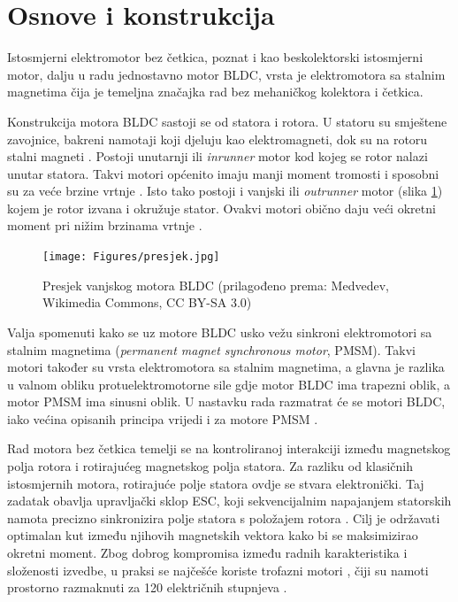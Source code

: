 \documentclass[diplomskirad, upload]{fer}
\begin{document}
\section{Osnove i konstrukcija}
\label{sec:bldc:uvod}

Istosmjerni elektromotor bez četkica, poznat i kao beskolektorski istosmjerni
motor, dalju u radu jednostavno motor BLDC, vrsta je elektromotora sa stalnim
magnetima čija je temeljna značajka rad bez mehaničkog kolektora i četkica.

Konstrukcija motora BLDC sastoji se od statora i rotora. U statoru su smještene
zavojnice, bakreni namotaji koji djeluju kao elektromagneti, dok su na rotoru
stalni magneti \cite{elektromotor-beskolektorski}. Postoji unutarnji ili
\textit{inrunner} motor kod kojeg se rotor nalazi unutar statora. Takvi motori
općenito imaju manji moment tromosti i sposobni su za veće brzine vrtnje
\cite{cite:bldc}. Isto tako postoji i vanjski ili \textit{outrunner} motor
(slika \ref{fig:presjek_motora}) kojem je rotor izvana i okružuje stator.
Ovakvi motori obično daju veći okretni moment pri nižim brzinama vrtnje
\cite{cite:bldc}.

\begin{figure}[h!]
	\centering
	\texttt{[image: Figures/presjek.jpg]}
	\caption{Presjek vanjskog motora BLDC (prilagođeno prema: Medvedev, Wikimedia Commons, CC BY-SA 3.0)}
	\label{fig:presjek_motora}
\end{figure}

Valja spomenuti kako se uz motore BLDC usko vežu sinkroni elektromotori sa
stalnim magnetima (\textit{permanent magnet synchronous motor}, PMSM). Takvi
motori također su vrsta elektromotora sa stalnim magnetima, a glavna je razlika
u valnom obliku protuelektromotorne sile gdje motor BLDC ima trapezni oblik, a
motor PMSM ima sinusni oblik. U nastavku rada razmatrat će se motori BLDC, iako
većina opisanih principa vrijedi i za motore PMSM
\cite{elektromotor-sa-stalnim-magnetima}.

Rad motora bez četkica temelji se na kontroliranoj interakciji između
magnetskog polja rotora i rotirajućeg magnetskog polja statora. Za razliku od
klasičnih istosmjernih motora, rotirajuće polje statora ovdje se stvara
elektronički. Taj zadatak obavlja upravljački sklop ESC, koji sekvencijalnim
napajanjem statorskih namota precizno sinkronizira polje statora s položajem
rotora \cite{cite:disertacija}. Cilj je održavati optimalan kut između njihovih
magnetskih vektora kako bi se maksimizirao okretni moment. Zbog dobrog
kompromisa između radnih karakteristika i složenosti izvedbe, u praksi se
najčešće koriste trofazni motori \cite{cite:trofazni}, čiji su namoti prostorno
razmaknuti za 120 električnih stupnjeva \cite{MicrochipAN885}.
\end{document}
